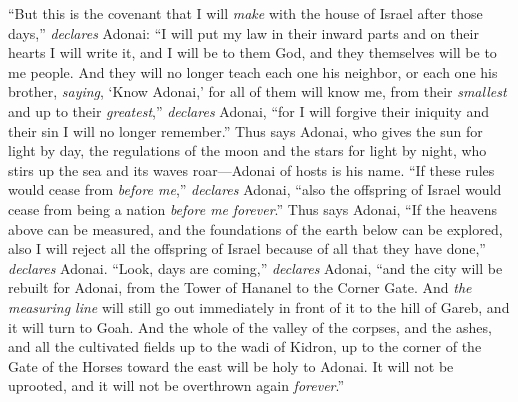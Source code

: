 \begin{biblechapter}
\verse “But this is the covenant that I will \textit{make} with the house of Israel after those days,” \textit{declares} Adonai: “I will put my law in their inward parts and on their hearts I will write it, and I will be to them God, and they themselves will be to me people.
\verse And they will no longer teach each one his neighbor, or each one his brother, \textit{saying}, ‘Know Adonai,’ for all of them will know me, from their \textit{smallest} and up to their \textit{greatest},” \textit{declares} Adonai, “for I will forgive their iniquity and their sin I will no longer remember.”
\verse Thus says Adonai, who gives the sun for light by day, the regulations of the moon and the stars for light by night, who stirs up the sea and its waves roar—Adonai of hosts is his name.
\verse “If these rules would cease from \textit{before me},” \textit{declares} Adonai, “also the offspring of Israel would cease from being a nation \textit{before me} \textit{forever}.”
\verse Thus says Adonai, “If the heavens above can be measured, and the foundations of the earth below can be explored, also I will reject all the offspring of Israel because of all that they have done,” \textit{declares} Adonai.
\verse “Look, days are coming,” \textit{declares} Adonai, “and the city will be rebuilt for Adonai, from the Tower of Hananel to the Corner Gate.
\verse And \textit{the measuring line} will still go out immediately in front of it to the hill of Gareb, and it will turn to Goah.
\verse And the whole of the valley of the corpses, and the ashes, and all the cultivated fields up to the wadi of Kidron, up to the corner of the Gate of the Horses toward the east will be holy to Adonai. It will not be uprooted, and it will not be overthrown again \textit{forever}.”
\end{biblechapter}

